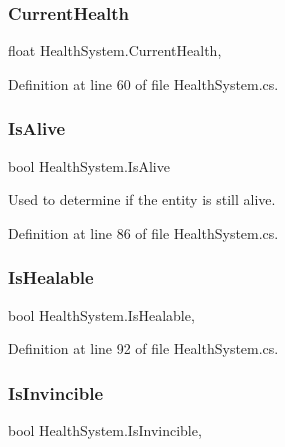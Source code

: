 \subsubsection{\texorpdfstring{Current\+Health}{CurrentHealth}}
{\footnotesize\ttfamily float Health\+System.\+Current\+Health\hspace{0.3cm}{\ttfamily [get]}, {\ttfamily [set]}}



Definition at line 60 of file Health\+System.\+cs.

\mbox{\label{class_health_system_a07ce65ebdae45aef952ed6858441c3d9}} 
\subsubsection{\texorpdfstring{Is\+Alive}{IsAlive}}
{\footnotesize\ttfamily bool Health\+System.\+Is\+Alive\hspace{0.3cm}{\ttfamily [get]}}



Used to determine if the entity is still alive. 



Definition at line 86 of file Health\+System.\+cs.

\mbox{\label{class_health_system_adeccc5512c7caf9c87ccb7c2ddda582c}} 
\subsubsection{\texorpdfstring{Is\+Healable}{IsHealable}}
{\footnotesize\ttfamily bool Health\+System.\+Is\+Healable\hspace{0.3cm}{\ttfamily [get]}, {\ttfamily [set]}}



Definition at line 92 of file Health\+System.\+cs.

\mbox{\label{class_health_system_ac3c807d6326bcf69776a4ab1ac2fcdc4}} 
\subsubsection{\texorpdfstring{Is\+Invincible}{IsInvincible}}
{\footnotesize\ttfamily bool Health\+System.\+Is\+Invincible\hspace{0.3cm}{\ttfamily [get]}, {\ttfamily [set]}}



